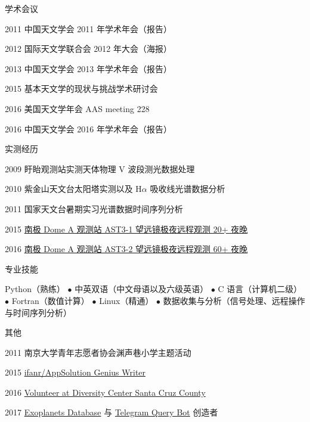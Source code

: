 \begin{resume}
\begin{cv}{}
\begin{cvlist}{学术会议}
\item[2011]   中国天文学会 2011 年学术年会（报告）
\item[2012]   国际天文学联合会 2012 年大会（海报）
\item[2013]   中国天文学会 2013 年学术年会（报告）
\item[2015]   基本天文学的现状与挑战学术研讨会
\item[2016]   美国天文学年会 AAS meeting 228
\item[2016]   中国天文学会 2016 年学术年会（报告）
\end{cvlist}   
\begin{cvlist}{实测经历}
\setlength{\itemsep}{-0.250\baselineskip plus 0.2em minus 0.2em}
\item[2009]    盱眙观测站实测天体物理 V 波段测光数据处理
\item[2010]    紫金山天文台太阳塔实测以及 H$\alpha$ 吸收线光谱数据分析
\item[2011]    国家天文台暑期实习光谱数据时间序列分析
\item[2015] \href{http://aag.bao.ac.cn/klaws/index.php}{南极 Dome A 观测站 AST3-1 望远镜极夜远程观测 20+ 夜晚}
\item[2016]  \href{http://aag.bao.ac.cn/klaws/index.php}{南极 Dome A 观测站 AST3-2 望远镜极夜远程观测 60+ 夜晚}
\end{cvlist}   
\begin{cvlist}{专业技能}
\item Python（熟练） $\bullet$ 中英双语（中文母语以及六级英语） $\bullet$ C 语言（计算机二级） $\bullet$ Fortran（数值计算） $\bullet$ Linux（精通） $\bullet$ 数据收集与分析（信号处理、远程操作与时间序列分析）
\end{cvlist}   
\begin{cvlist}{其他}
\setlength{\itemsep}{-0.250\baselineskip plus 0.2em minus 0.2em}
\item[2011]  南京大学青年志愿者协会渊声巷小学主题活动
\item[2015]  \href{http://www.ifanr.com/author/meldonization}{ifanr/AppSolution Genius Writer}
\item[2016] \href{http://www.diversitycenter.org/}{Volunteer at Diversity Center Santa Cruz County}
\item[2017] \href{https://github.com/EXONJU/ExoPlanetList}{Exoplanets Database} 与 \href{https://telegram.me/exoplanets_bot}{Telegram Query Bot} 创造者
\end{cvlist} 

\end{cv}
\end{resume}
